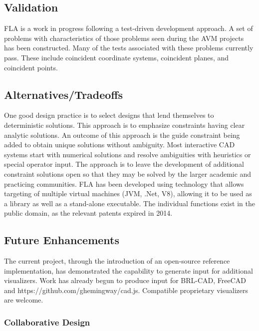 \documentclass[]{report}
\begin{document}
\subsection{Validation} 

FLA is a work in progress following a test-driven development approach. 
A set of problems with characteristics of those problems seen during the AVM projects has been constructed. 
Many of the tests associated with these problems currently pass. 
These include coincident coordinate systems, coincident planes, and coincident points.
 
\subsection{Alternatives/Tradeoffs}

One good design practice is to select designs that lend themselves to deterministic solutions. 
This approach is to emphasize constraints having clear analytic solutions. 
An outcome of this approach is the guide constraint being added to obtain unique solutions without ambiguity.
Most interactive CAD systems start with numerical solutions and resolve ambiguities 
with heuristics or special operator input. The approach is to leave 
the development of additional constraint solutions open so that they
may be solved by the larger academic and practicing communities. 
FLA has been developed using technology that allows targeting 
of multiple virtual machines (JVM, .Net, V8), allowing it 
to be used as a library as well as a stand-alone executable. 
The individual functions exist in the public domain, as the relevant patents expired in 2014.

\subsection{Future Enhancements}

The current project, through the introduction of an open-source reference implementation, 
has demonstrated the capability to generate input for additional visualizers. 
Work has already begun to produce input for BRL-CAD, FreeCAD and  https://github.com/ghemingway/cad.js. 
Compatible proprietary visualizers are welcome.

\subsubsection{Collaborative Design}
\end{document}
